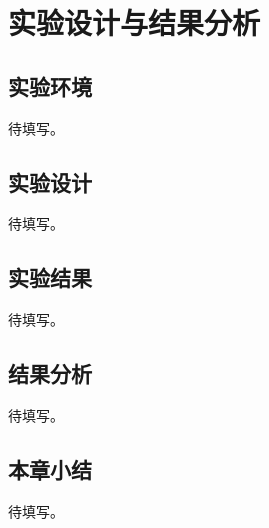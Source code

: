 \chapter{实验设计与结果分析}

\section{实验环境}
待填写。

\section{实验设计}
待填写。

\section{实验结果}
待填写。

\section{结果分析}
待填写。

\section{本章小结}
待填写。
